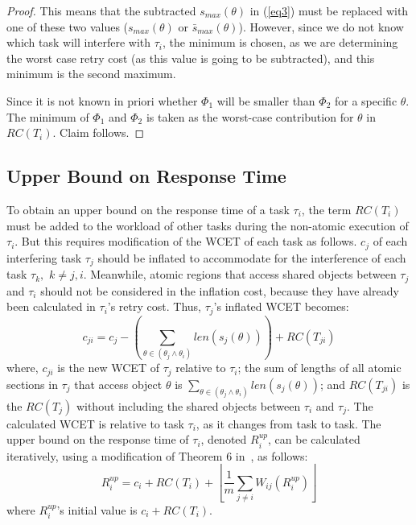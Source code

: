 \documentclass{sig-alternate}
\begin{document}
\begin{proof}
This means that the subtracted $s_{max}(\theta)$ in (\ref{eq3})
must be replaced with one of these two values ($s_{max}(\theta)$ or $\bar{s}_{max}(\theta)$). However, since we do not know  which task will interfere with $\tau_i$, the minimum is chosen, as we are determining the worst case retry cost (as this value is going to be subtracted),
and this minimum is the second maximum.

Since it is not known in priori whether $\Phi_1$ will be smaller than $\Phi_2$ for a specific $\theta$. The minimum of $\Phi_1$ and $\Phi_2$ is taken as the worst-case contribution for $\theta$ in $RC(T_i)$. Claim follows.
\end{proof}


\subsection{Upper Bound on Response Time}

To obtain an upper bound on the response time of a task $\tau_{i}$, the term $RC(T_{i})$ must be added to the workload of other tasks during the non-atomic
execution of $\tau_{i}$. But this requires modification of the WCET of each
task as follows. 
$c_{j}$ of each interfering task $\tau_{j}$ should be inflated to accommodate for the interference of each task $\tau_{k},$ $k\ne j,i$. Meanwhile, atomic regions that access shared objects between $\tau_{j}$ and $\tau_{i}$ should not be considered in the inflation cost, because they have already been calculated in $\tau_{i}$'s retry cost. Thus, $\tau_{j}$'s inflated WCET becomes:
\begin{equation}
c_{ji}=c_{j}-\left(\sum_{\theta\in(\theta_{j}\wedge\theta_{i})}len \left(s_{j}(\theta) \right) \right)+RC(T_{ji})\label{eq9}\end{equation}
where, $c_{ji}$ is the new WCET of $\tau_{j}$ relative to $\tau_{i}$; 
the sum of lengths of all atomic sections in $\tau_{j}$ that access object $\theta$ is $\sum_{\theta \in (\theta_j \wedge \theta_i)} {len(s_{j}(\theta))}$; and $RC(T_{ji})$ is the $RC(T_j)$ 
 without including the shared objects between $\tau_{i}$ and $\tau_{j}$.
The calculated WCET is relative to task $\tau_{i}$, as it changes from task to task. The upper bound on the response time of $\tau_{i}$, denoted $R_{i}^{up}$, can be calculated iteratively, using a modification of Theorem 6 in~\cite{key-2}, as follows:
\begin{equation}
R_{i}^{up}=c_{i}+RC(T_{i})+\left\lfloor\frac{1}{m}\sum_{j\ne i}W_{ij}(R_{i}^{up})\right\rfloor
\label{eq10}
\end{equation}
where $R_{i}^{up}$'s initial value is $c_{i}+RC(T_{i})$.
\end{document}
